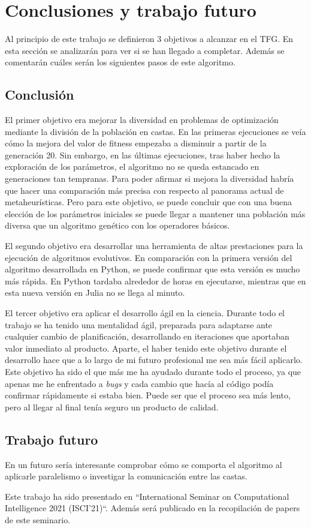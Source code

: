 \chapter{Conclusiones y trabajo futuro}

Al principio de este trabajo se definieron 3 objetivos a alcanzar en el TFG. En esta sección
se analizarán para ver si se han llegado a completar. Además se comentarán cuáles serán
los siguientes pasos de este algoritmo.

\section{Conclusión}

El primer objetivo era mejorar la diversidad en problemas de optimización mediante la división de la población en castas.
En las primeras ejecuciones se veía cómo la mejora del valor de fitness empezaba a disminuir a partir de la generación 20. Sin embargo,
en las últimas ejecuciones, tras haber hecho la exploración de los parámetros, el algoritmo no se queda estancado en generaciones
tan tempranas. Para poder afirmar si mejora la diversidad habría que hacer una comparación más precisa con respecto al panorama actual 
de metaheurísticas. Pero para este objetivo, se puede concluir que con una buena elección de los parámetros iniciales se 
puede llegar a mantener una población más diversa que un algoritmo genético con los operadores básicos.

El segundo objetivo era desarrollar una herramienta de altas prestaciones para la ejecución de algoritmos evolutivos. En comparación
con la primera versión del algoritmo desarrollada en Python, se puede confirmar que esta versión es mucho más rápida. En Python tardaba alrededor
de horas en ejecutarse, mientras que en esta nueva versión en Julia no se llega al minuto. 

El tercer objetivo era aplicar el desarrollo ágil en la ciencia. Durante todo el trabajo se ha tenido una mentalidad ágil, preparada para adaptarse ante 
cualquier cambio de planificación, desarrollando en iteraciones que aportaban valor inmediato al producto. Aparte, el haber tenido este objetivo
durante el desarrollo hace que a lo largo de mi futuro profesional me sea más fácil aplicarlo. Este objetivo ha sido el que más me ha ayudado
durante todo el proceso, ya que apenas me he enfrentado a \emph{bugs} y cada cambio que hacía al código podía confirmar rápidamente si estaba 
bien. Puede ser que el proceso sea más lento, pero al llegar al final tenía seguro un producto de calidad.

\section{Trabajo futuro}

En un futuro sería interesante comprobar cómo se comporta el algoritmo al aplicarle paralelismo o investigar la comunicación entre las castas. 

Este trabajo ha sido presentado en ``International Seminar on Computational Intelligence 2021 (ISCI'21)``. Además será publicado 
en la recopilación de papers de este seminario.
